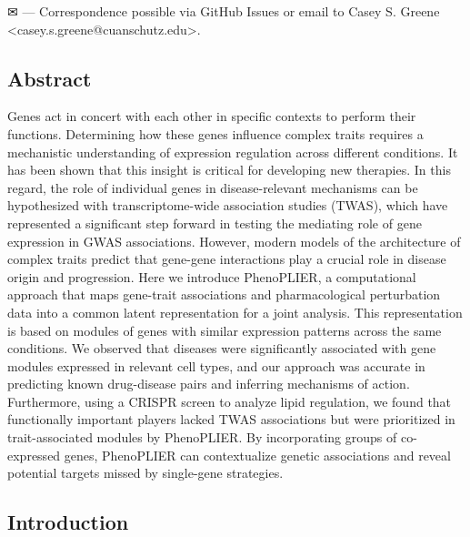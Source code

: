 \documentclass[
]{article}
\begin{document}
\leavevmode{}%
✉ --- Correspondence possible via GitHub Issues
or email to
Casey S. Greene \textless casey.s.greene@cuanschutz.edu\textgreater.

\hypertarget{abstract}{%
\subsection{Abstract}\label{abstract}}

Genes act in concert with each other in specific contexts to perform their functions.
Determining how these genes influence complex traits requires a mechanistic understanding of expression regulation across different conditions.
It has been shown that this insight is critical for developing new therapies.
In this regard, the role of individual genes in disease-relevant mechanisms can be hypothesized with transcriptome-wide association studies (TWAS), which have represented a significant step forward in testing the mediating role of gene expression in GWAS associations.
However, modern models of the architecture of complex traits predict that gene-gene interactions play a crucial role in disease origin and progression.
Here we introduce PhenoPLIER, a computational approach that maps gene-trait associations and pharmacological perturbation data into a common latent representation for a joint analysis.
This representation is based on modules of genes with similar expression patterns across the same conditions.
We observed that diseases were significantly associated with gene modules expressed in relevant cell types, and our approach was accurate in predicting known drug-disease pairs and inferring mechanisms of action.
Furthermore, using a CRISPR screen to analyze lipid regulation, we found that functionally important players lacked TWAS associations but were prioritized in trait-associated modules by PhenoPLIER.
By incorporating groups of co-expressed genes, PhenoPLIER can contextualize genetic associations and reveal potential targets missed by single-gene strategies.

\hypertarget{introduction}{%
\subsection{Introduction}\label{introduction}}
\end{document}
